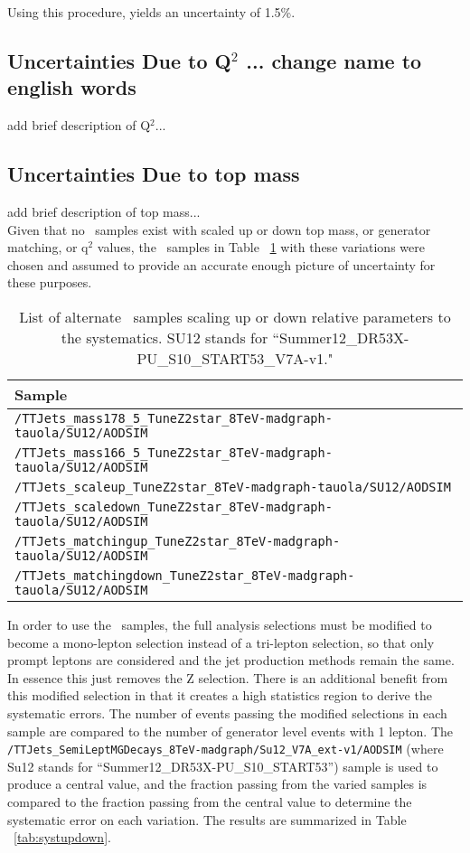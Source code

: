 Using this procedure, yields an uncertainty of 1.5\%.

\subsection{Uncertainties Due to Q$^2$ ... change name to english words}
add brief description of Q$^2$...\\

\subsection{Uncertainties Due to top mass}
add brief description of top mass...\\
Given that no \ttZ \ samples exist with scaled up or down top mass, or generator matching, or q$^2$ values, the \ttbar \ samples in Table ~\ref{tab:sampleupdown} with these variations were chosen and assumed to provide an accurate enough picture of uncertainty for these purposes.
\begin{table}[h]
\begin{center}
\caption{\small\label{tab:sampleupdown} List of alternate \ttbar \ samples scaling up or down relative parameters to the systematics. SU12 stands for ``Summer12\_DR53X-PU\_S10\_START53\_V7A-v1."}
\begin{tabular}{l}\hline
Sample   \\ \hline
 \verb=/TTJets_mass178_5_TuneZ2star_8TeV-madgraph-tauola/SU12/AODSIM=   \\
 \verb=/TTJets_mass166_5_TuneZ2star_8TeV-madgraph-tauola/SU12/AODSIM=   \\  %
 \verb=/TTJets_scaleup_TuneZ2star_8TeV-madgraph-tauola/SU12/AODSIM=  \\
 \verb=/TTJets_scaledown_TuneZ2star_8TeV-madgraph-tauola/SU12/AODSIM=  \\ %
 \verb=/TTJets_matchingup_TuneZ2star_8TeV-madgraph-tauola/SU12/AODSIM=  \\
 \verb=/TTJets_matchingdown_TuneZ2star_8TeV-madgraph-tauola/SU12/AODSIM=  \\
\hline
\end{tabular}
\end{center}
\end{table}

In order to use the \ttbar \ samples, the full analysis selections must be modified to become a mono-lepton selection instead of a tri-lepton selection, so that only prompt leptons are considered and the jet production methods remain the same. In essence this just removes the Z selection. There is an additional benefit from this modified selection in that it creates a high statistics region to derive the systematic errors. The number of events passing the modified selections in each sample are compared to the number of generator level events with 1 lepton. The \verb=/TTJets_SemiLeptMGDecays_8TeV-madgraph/Su12_V7A_ext-v1/AODSIM=  (where Su12 stands for ``Summer12\_DR53X-PU\_S10\_START53'') sample is used to produce a central value, and the fraction passing from the varied samples is compared to the fraction passing from the central value to determine the systematic error on each variation. The results are summarized in Table ~\ref{tab:systupdown}.


